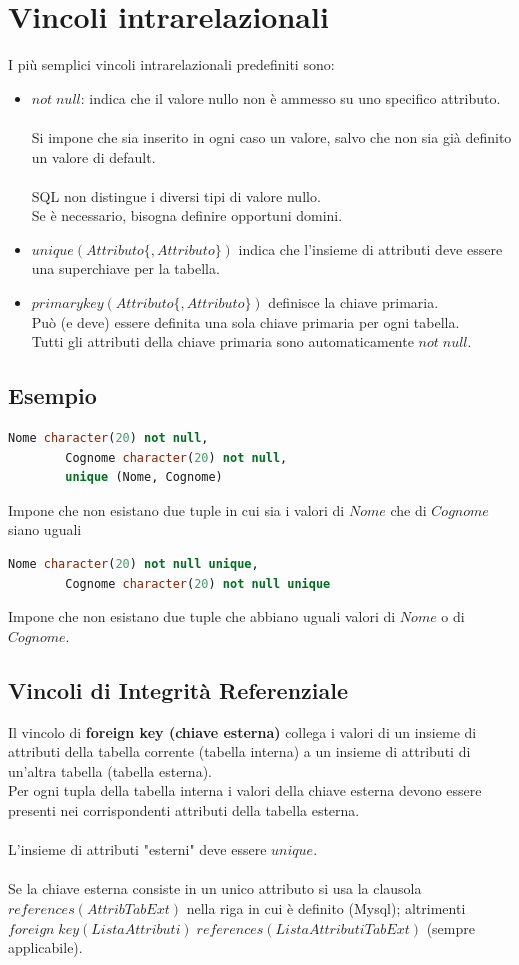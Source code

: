 \documentclass{article}
\begin{document}
	\section{Vincoli intrarelazionali}
	I più semplici vincoli intrarelazionali predefiniti sono:
	\begin{itemize}
		\item $not \; null$: indica che il valore nullo non è ammesso su uno specifico attributo.\\\\
		Si impone che sia inserito in ogni caso un valore, salvo che non sia già definito un valore di default.\\\\
		SQL non distingue i diversi tipi di valore nullo. \\
		Se è necessario, bisogna definire opportuni domini.
		\item $unique(Attributo \{, Attributo\})$ indica che l’insieme di attributi deve essere una superchiave per la tabella.
		\item $primary key(Attributo \{, Attributo\})$ definisce la chiave primaria. \\
		Può (e deve) essere definita una sola chiave primaria per ogni tabella.\\
		Tutti gli attributi della chiave primaria sono automaticamente $not \; null$.
	\end{itemize}
	\subsection{Esempio}
	\begin{lstlisting}[language=SQL]
		Nome character(20) not null,
		Cognome character(20) not null,
		unique (Nome, Cognome)
	\end{lstlisting}
	Impone che non esistano due tuple in cui sia i valori di $Nome$ che di $Cognome$ siano uguali
	\begin{lstlisting}[language=SQL]
		Nome character(20) not null unique,
		Cognome character(20) not null unique
	\end{lstlisting}
	Impone che non esistano due tuple che abbiano
	uguali valori di $Nome$ o di $Cognome$.
	\subsection{Vincoli di Integrità Referenziale}
	Il vincolo di \textbf{foreign key (chiave esterna)} collega i valori di un insieme di attributi della tabella corrente (tabella interna) a un insieme di attributi di un’altra tabella (tabella esterna). \\
	Per ogni tupla della tabella interna i valori della chiave esterna devono essere presenti nei corrispondenti attributi della tabella esterna.\\\\
	L’insieme di attributi "esterni" deve essere $unique$.\\\\
	Se la chiave esterna consiste in un unico attributo si usa la clausola $references(AttribTabExt)$ nella riga in cui è definito (Mysql); altrimenti $foreign \; key(ListaAttributi) \;  references(ListaAttributiTabExt)$ (sempre applicabile).
\end{document}

